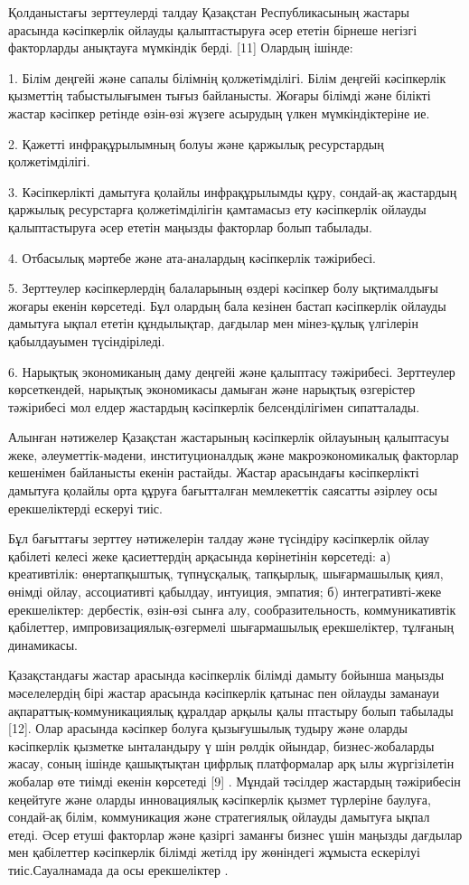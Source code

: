 \begin{multicols}{2}
Қолданыстағы зерттеулерді талдау Қазақстан Республикасының жастары
арасында кәсіпкерлік ойлауды қалыптастыруға әсер ететін бірнеше негізгі
факторларды анықтауға мүмкіндік берді. {[}11{]} Олардың ішінде:

  1. Білім деңгейі және сапалы білімнің қолжетімділігі. Білім деңгейі
  кәсіпкерлік қызметтің табыстылығымен тығыз байланысты. Жоғары білімді
  және білікті жастар кәсіпкер ретінде өзін-өзі жүзеге асырудың үлкен
  мүмкіндіктеріне ие.

  2. Қажетті инфрақұрылымның болуы және қаржылық ресурстардың
  қолжетімділігі.

  3. Кәсіпкерлікті дамытуға қолайлы инфрақұрылымды құру, сондай-ақ
  жастардың қаржылық ресурстарға қолжетімділігін қамтамасыз ету
  кәсіпкерлік ойлауды қалыптастыруға әсер ететін маңызды факторлар болып
  табылады.

  4. Отбасылық мәртебе және ата-аналардың кәсіпкерлік тәжірибесі.

  5. Зерттеулер кәсіпкерлердің балаларының өздері кәсіпкер болу ықтималдығы
  жоғары екенін көрсетеді. Бұл олардың бала кезінен бастап кәсіпкерлік
  ойлауды дамытуға ықпал ететін құндылықтар, дағдылар мен мінез-құлық
  үлгілерін қабылдауымен түсіндіріледі.

  6. Нарықтық экономиканың даму деңгейі және қалыптасу тәжірибесі.
  Зерттеулер көрсеткендей, нарықтық экономикасы дамыған және нарықтық
  өзгерістер тәжірибесі мол елдер жастардың кәсіпкерлік белсенділігімен
  сипатталады.

Алынған нәтижелер Қазақстан жастарының кәсіпкерлік ойлауының қалыптасуы
жеке, әлеуметтік-мәдени, институционалдық және макроэкономикалық
факторлар кешенімен байланысты екенін растайды. Жастар арасындағы
кәсіпкерлікті дамытуға қолайлы орта құруға бағытталған мемлекеттік
саясатты әзірлеу осы ерекшеліктерді ескеруі тиіс.

Бұл бағыттағы зерттеу нәтижелерін талдау және түсіндіру кәсіпкерлік
ойлау қабілеті келесі жеке қасиеттердің арқасында көрінетінін көрсетеді:
а) креативтілік: өнертапқыштық, түпнұсқалық, тапқырлық, шығармашылық
қиял, өнімді ойлау, ассоциативті қабылдау, интуиция, эмпатия; б)
интегративті-жеке ерекшеліктер: дербестік, өзін-өзі сынға алу,
сообразительность, коммуникативтік қабілеттер, импровизациялық-өзгермелі
шығармашылық ерекшеліктер, тұлғаның динамикасы.

Қазақстандағы жастар арасында кәсіпкерлік білімді дамыту бойынша маңызды
мәселелердің бірі жастар арасында кәсіпкерлік қатынас пен ойлауды
заманауи ақпараттық-коммуникациялық құралдар арқылы қалы птастыру болып
табылады {[}12{]}. Олар арасында кәсіпкер болуға қызығушылық тудыру және
оларды кәсіпкерлік қызметке ынталандыру ү шін рөлдік ойындар,
бизнес-жобаларды жасау, соның ішінде қашықтықтан цифрлық платформалар
арқ ылы жүргізілетін жобалар өте тиімді екенін көрсетеді {[}9{]} .
Мұндай тәсілдер жастардың тәжірибесін кеңейтуге және оларды инновациялық
кәсіпкерлік қызмет түрлеріне баулуға, сондай-ақ білім, коммуникация және
стратегиялық ойлауды дамытуға ықпал етеді. Әсер етуші факторлар және
қазіргі заманғы бизнес үшін маңызды дағдылар мен қабілеттер кәсіпкерлік
білімді жетілд іру жөніндегі жұмыста ескерілуі тиіс.Сауалнамада да осы
ерекшеліктер .


\end{multicols}
